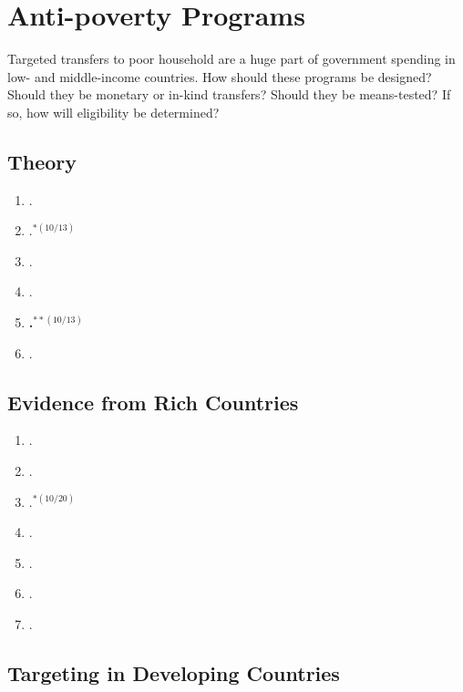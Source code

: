\documentclass[11pt]{article}
\begin{document}
\section{ Anti-poverty Programs}
Targeted transfers to poor household are a huge part of government spending in low- and middle-income countries. How should these programs be designed? Should they be monetary or in-kind transfers? Should they be means-tested? If so, how will eligibility be determined?


\subsection{Theory}

\begin{enumerate}
\item {}.
\item {}.$^{*(10/13)}$
\item {}.
\item {}.
\item \textbf{.$^{**(10/13)}$}
\item {}.
\end{enumerate}

\subsection{Evidence from Rich Countries}

\begin{enumerate}
\item {}.
\item {}.
\item {}.$^{*(10/20)}$
\item {}.
\item {}.
\item {}.
\item {}.
\end{enumerate}

\subsection{Targeting in Developing Countries}
\end{document}
